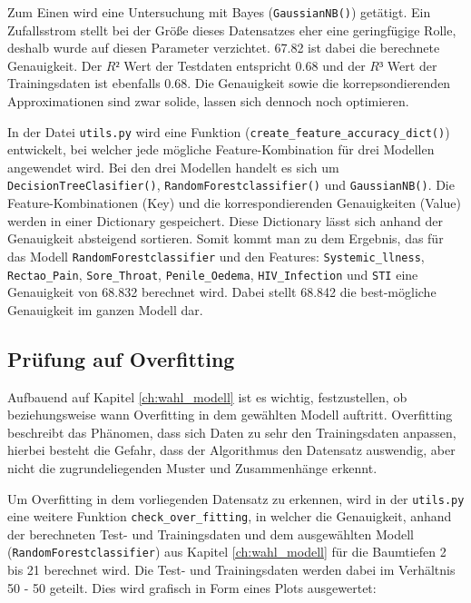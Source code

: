 \documentclass[13pt,a4paper, listof=entryprefix, bibliography=totocnumbered,toc=listofnumbered,lof=listofnumbered]{scrartcl}
\begin{document}
	Zum Einen wird eine Untersuchung mit Bayes (\lstinline{GaussianNB()}) getätigt. Ein Zufallsstrom stellt bei der Größe dieses Datensatzes eher eine geringfügige
	Rolle, deshalb wurde auf diesen Parameter verzichtet. 67.82 ist dabei die berechnete Genauigkeit. Der $R²$ Wert der Testdaten entspricht 0.68 und der $R³$ Wert der
	Trainingsdaten ist ebenfalls 0.68.  Die Genauigkeit sowie die korrepsondierenden Approximationen sind zwar solide, lassen sich dennoch noch optimieren. 

	In der Datei \lstinline{utils.py} wird eine Funktion (\lstinline{create_feature_accuracy_dict()}) entwickelt, bei welcher jede mögliche Feature-Kombination für drei Modellen angewendet wird. Bei den drei Modellen handelt es sich um 
	\lstinline{DecisionTreeClasifier()}, \lstinline{RandomForestclassifier()} und \lstinline{GaussianNB()}. Die Feature-Kombinationen (Key) und die korrespondierenden Genauigkeiten (Value) werden in 
	einer Dictionary gespeichert. Diese Dictionary lässt sich anhand der Genauigkeit absteigend sortieren. Somit kommt man zu dem Ergebnis, das für das Modell \lstinline{RandomForestclassifier} und 
	den Features: \lstinline{Systemic_llness}, \lstinline{Rectao_Pain}, \lstinline{Sore_Throat}, \lstinline{Penile_Oedema}, \lstinline{HIV_Infection} und \lstinline{STI} eine Genauigkeit von 68.832 berechnet wird. Dabei stellt
	68.842 die best-mögliche Genauigkeit im ganzen Modell dar. 

	\subsection{Prüfung auf Overfitting}
		\label{ch:pruefung_overfitting}

	Aufbauend auf Kapitel \ref{ch:wahl_modell} ist es wichtig, festzustellen, ob beziehungsweise wann Overfitting in dem gewählten Modell auftritt. Overfitting beschreibt das Phänomen, dass
	sich Daten zu sehr den Trainingsdaten anpassen, hierbei besteht die Gefahr, dass der Algorithmus den Datensatz auswendig, aber nicht die zugrundeliegenden Muster und Zusammenhänge erkennt.
	
	Um Overfitting in dem vorliegenden Datensatz zu erkennen, wird in der \lstinline{utils.py} eine weitere Funktion \lstinline{check_over_fitting}, in welcher
	die Genauigkeit, anhand der berechneten Test- und Trainingsdaten und dem ausgewählten Modell (\lstinline{RandomForestclassifier}) aus 
	Kapitel \ref{ch:wahl_modell} für die Baumtiefen 2 bis 21 berechnet wird. Die Test- und Trainingsdaten werden dabei im Verhältnis 50 - 50 geteilt. 
	Dies wird grafisch in Form eines Plots ausgewertet: 
\end{document}
